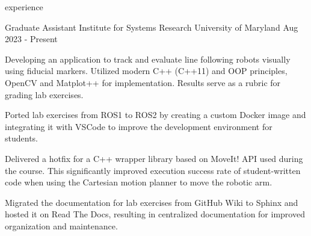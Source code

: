 \begin{section}{experience}

  \begin{work}
    {Graduate Assistant}
    {Institute for Systems Research}
    {University of Maryland}
    {Aug 2023 - Present}




    \item Developing an application to track and evaluate line following robots visually using fiducial
          markers. Utilized modern C++ (C++11) and OOP principles, OpenCV and Matplot++ for
          implementation. Results serve as a rubric for grading lab exercises.


    \item Ported lab exercises from ROS1 to ROS2 by creating a custom Docker image and
          integrating it with VSCode to improve the development environment for students.

    \item Delivered a hotfix for a C++ wrapper library based on MoveIt!
          API used during the course. This significantly improved execution
          success rate of student-written code when using the Cartesian
          motion planner to move the robotic arm.

    \item Migrated the documentation for lab exercises from
          GitHub Wiki to Sphinx and hosted it on Read The Docs, resulting in
          centralized documentation for improved organization and maintenance.


\end{work}
\end{section}
